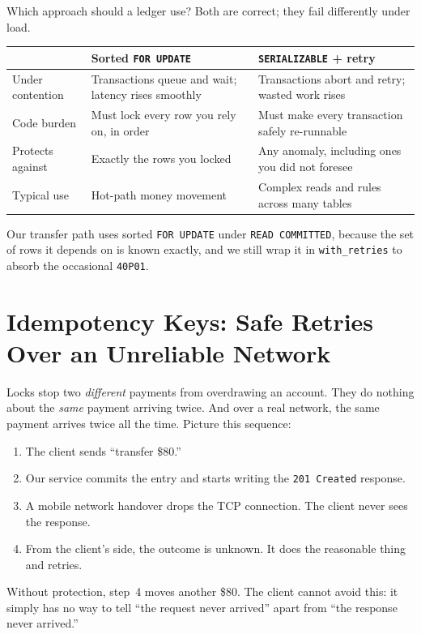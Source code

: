 Which approach should a ledger use? Both are correct; they fail differently under load.
\begin{center}
\footnotesize
\begin{tabular}{@{}p{3.2cm}p{5.5cm}p{5.5cm}@{}}
\toprule
 & \textbf{Sorted \texttt{FOR UPDATE}} & \textbf{\texttt{SERIALIZABLE} + retry} \\
\midrule
Under contention & Transactions queue and wait; latency rises smoothly & Transactions abort and retry; wasted work rises \\
Code burden & Must lock every row you rely on, in order & Must make every transaction safely re-runnable \\
Protects against & Exactly the rows you locked & Any anomaly, including ones you did not foresee \\
Typical use & Hot-path money movement & Complex reads and rules across many tables \\
\bottomrule
\end{tabular}
\end{center}
Our transfer path uses sorted \texttt{FOR UPDATE} under \texttt{READ COMMITTED}, because the set of rows it depends on is known exactly, and we still wrap it in \texttt{with\_retries} to absorb the occasional \texttt{40P01}.

\section{Idempotency Keys: Safe Retries Over an Unreliable Network}
\label{ch14:idempotency}

Locks stop two \emph{different} payments from overdrawing an account. They do nothing about the \emph{same} payment arriving twice. And over a real network, the same payment arrives twice all the time. Picture this sequence:
\begin{enumerate}
  \item The client sends ``transfer \$80.''
  \item Our service commits the entry and starts writing the \texttt{201 Created} response.
  \item A mobile network handover drops the TCP connection. The client never sees the response.
  \item From the client's side, the outcome is unknown. It does the reasonable thing and retries.
\end{enumerate}
Without protection, step~4 moves another \$80. The client cannot avoid this: it simply has no way to tell ``the request never arrived'' apart from ``the response never arrived.''


